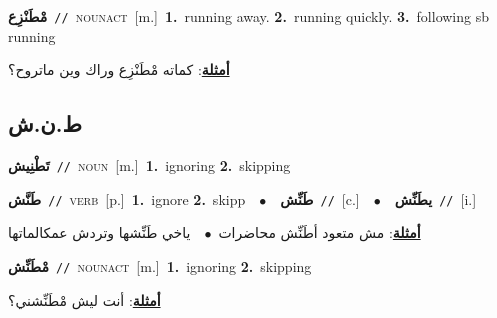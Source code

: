 \documentclass[10pt,a4paper,twoside]{article} %
\begin{document}
\begin{multicols}{2}
{\setlength\topsep{0pt}\textbf{\foreignlanguage{arabic}{مْطَنْزِع}}\ {\color{gray}\texttt{//}\color{black}}\ \textsc{noun\textunderscore act}\ [m.]\ \textbf{1.}~running away.  \textbf{2.}~running quickly.  \textbf{3.}~following sb running\  \begin{flushright}\color{gray}\foreignlanguage{arabic}{\textbf{\underline{\foreignlanguage{arabic}{أمثلة}}}: كماته مْطَنْزِع وراك وين ماتروح؟}\end{flushright}\color{black}} \vspace{2mm}

\vspace{-3mm}
\subsection*{\color{blue}\foreignlanguage{arabic}{ط.ن.ش}\color{blue}{}} 

{\setlength\topsep{0pt}\textbf{\foreignlanguage{arabic}{تَطْنِيش}}\ {\color{gray}\texttt{//}\color{black}}\ \textsc{noun}\ [m.]\ \textbf{1.}~ignoring  \textbf{2.}~skipping\ } \vspace{2mm}

{\setlength\topsep{0pt}\textbf{\foreignlanguage{arabic}{طَنَّش}}\ {\color{gray}\texttt{//}\color{black}}\ \textsc{verb}\ [p.]\ \textbf{1.}~ignore  \textbf{2.}~skipp\ \ $\bullet$\ \ \setlength\topsep{0pt}\textbf{\foreignlanguage{arabic}{طَنِّش}}\ {\color{gray}\texttt{//}\color{black}}\ [c.]\ \ $\bullet$\ \ \setlength\topsep{0pt}\textbf{\foreignlanguage{arabic}{يطَنِّش}}\ {\color{gray}\texttt{//}\color{black}}\ [i.]\  \begin{flushright}\color{gray}\foreignlanguage{arabic}{\textbf{\underline{\foreignlanguage{arabic}{أمثلة}}}: مش متعود أطَنِّش محاضرات\ $\bullet$\ \  ياخي طَنِّشها وتردش عمكالماتها}\end{flushright}\color{black}} \vspace{2mm}

{\setlength\topsep{0pt}\textbf{\foreignlanguage{arabic}{مْطَنِّش}}\ {\color{gray}\texttt{//}\color{black}}\ \textsc{noun\textunderscore act}\ [m.]\ \textbf{1.}~ignoring  \textbf{2.}~skipping\  \begin{flushright}\color{gray}\foreignlanguage{arabic}{\textbf{\underline{\foreignlanguage{arabic}{أمثلة}}}: أنت ليش مْطَنِّشني؟}\end{flushright}\color{black}} \vspace{2mm}


\end{multicols}
\end{document}
